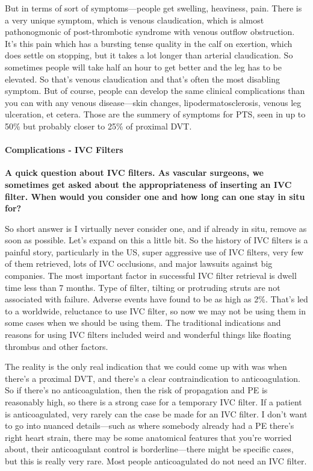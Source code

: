 \documentclass[
]{book}
\begin{document}
But in terms of sort of symptoms---people get swelling, heaviness, pain.
There is a very unique symptom, which is venous claudication, which is
almost pathonogmonic of post-thrombotic syndrome with venous outflow
obstruction. It's this pain which has a bursting tense quality in the
calf on exertion, which does settle on stopping, but it takes a lot
longer than arterial claudication. So sometimes people will take half an
hour to get better and the leg has to be elevated. So that's venous
claudication and that's often the most disabling symptom. But of course,
people can develop the same clinical complications than you can with any
venous disease---skin changes, lipodermatosclerosis, venous leg
ulceration, et cetera. Those are the summery of symptoms for PTS, seen
in up to 50\% but probably closer to 25\% of proximal DVT.

\hypertarget{complications---ivc-filters}{%
\paragraph{Complications - IVC Filters}\label{complications---ivc-filters}}

\textbf{A quick question about IVC filters. As vascular surgeons, we sometimes
get asked about the appropriateness of inserting an IVC filter. When
would you consider one and how long can one stay in situ for?}

So short answer is I virtually never consider one, and if already in
situ, remove as soon as possible. Let's expand on this a little bit. So
the history of IVC filters is a painful story, particularly in the US,
super aggressive use of IVC filters, very few of them retrieved, lots of
IVC occlusions, and major lawsuits against big companies. The most
important factor in successful IVC filter retrieval is dwell time less
than 7 months. Type of filter, tilting or protruding struts are not
associated with failure. Adverse events have found to be as high as
2\%.\citep{desai2017} That's led to a worldwide, reluctance to use IVC filter,
so now we may not be using them in some cases when we should be using
them. The traditional indications and reasons for using IVC filters
included weird and wonderful things like floating thrombus and other
factors.

The reality is the only real indication that we could come up with was
when there's a proximal DVT, and there's a clear contraindication to
anticoagulation. So if there's no anticoagulation, then the risk of
propagation and PE is reasonably high, so there is a strong case for a
temporary IVC filter. If a patient is anticoagulated, very rarely can
the case be made for an IVC filter. I don't want to go into nuanced
details---such as where somebody already had a PE there's right heart
strain, there may be some anatomical features that you're worried about,
their anticoagulant control is borderline---there might be specific
cases, but this is really very rare. Most people anticoagulated do not
need an IVC filter.
\end{document}
